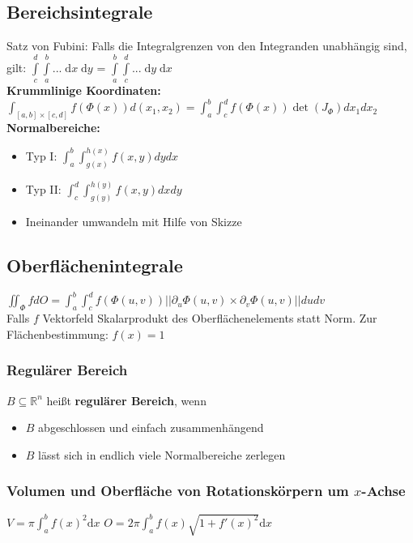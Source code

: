 \documentclass[6pt,a4paper]{scrartcl}
\renewcommand{\emph}[1]{\textbf{#1}}															%
\newcommand{\diff}{\ensuremath{\;\mathrm d}}									%
\newcommand{\R}{\ensuremath{\mathbb R}}
\begin{document}
\begin{multicols*}{4}


\section{Bereichsintegrale}
Satz von Fubini: Falls die Integralgrenzen von den Integranden unabhängig sind, gilt: $\int\limits^d_c \int\limits^b_a ... \diff x \diff y$ = $\int\limits^b_a \int\limits^d_c ... \diff y \diff x$\\
\textbf{Krummlinige Koordinaten:}\\ $\int_{[a,b] \times [c,d]}f(\Phi(x))d(x_1,x_2) = \int_a^b \int_c^d f(\Phi(x)) \det(J_\Phi) dx_1dx_2$
\textbf{Normalbereiche:}
\begin{itemize}
  \item Typ I: $\int_a^b \int_{g(x)}^{h(x)} f(x,y)dydx$
  \item Typ II: $\int_c^d \int_{g(y)}^{h(y)} f(x,y)dxdy$
  \item Ineinander umwandeln mit Hilfe von Skizze
\end{itemize}

\subsection{Oberflächenintegrale}
$\iint_\Phi f dO = \int_a^b\int_c^d f(\Phi(u,v)) ||\partial_u \Phi(u,v) \times \partial_v \Phi(u,v)||du dv$\\
Falls $f$ Vektorfeld Skalarprodukt des Oberflächenelements statt Norm. Zur Flächenbestimmung: $f(x) = 1$

\subsubsection{Regulärer Bereich}
$B \subseteq \R^n$ heißt \emph{regulärer Bereich}, wenn
\begin{itemize}
	\item $B$ abgeschlossen und einfach zusammenhängend
	\item $B$ lässt sich in endlich viele Normalbereiche zerlegen\\
\end{itemize}				

\subsubsection{Volumen und Oberfläche von Rotationskörpern um $x$-Achse}
$V = \pi \int_a^b f(x)^2 \mathrm dx$ \qquad \quad $O = 2 \pi \int_a^b f(x) \sqrt{1 + f'(x)^2} \mathrm dx$


\end{multicols*}
\end{document}
